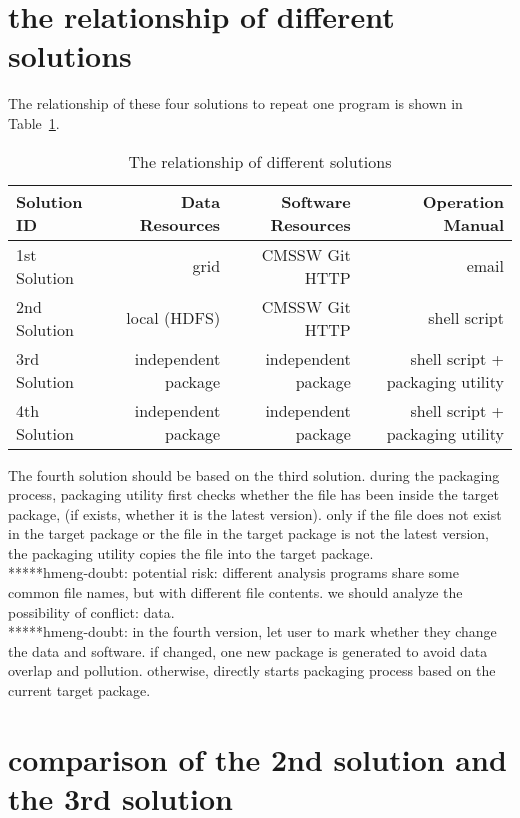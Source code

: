 \documentclass{article}
\begin{document}
\section{the relationship of different solutions}
\indent The relationship of these four solutions to repeat one program is shown in Table~\ref{table:relationship}.\\

\begin{table}
    \centering
    \begin{tabular}{|l|r|r|r|}
        \hline
        Solution ID & Data Resources & Software Resources & Operation Manual \\ \hline
        1st Solution & grid & CMSSW Git HTTP & email \\ \hline
        2nd Solution & local (HDFS) & CMSSW Git HTTP & shell script \\ \hline
        3rd Solution & independent package & independent package & shell script + packaging utility \\ \hline
        4th Solution & independent package & independent package & shell script + packaging utility \\ \hline
    \end{tabular}
    \caption{The relationship of different solutions}
    \label{table:relationship}
\end{table}

The fourth solution should be based on the third solution. during the packaging process, packaging utility first checks whether the file has been inside the target package, (if exists, whether it is the latest version). only if the file does not exist in the target package or the file in the target package is not the latest version, the packaging utility copies the file into the target package.\\

*****hmeng-doubt: potential risk: different analysis programs share some common file names, but with different file contents. we should analyze the possibility of conflict: data.\\

*****hmeng-doubt: in the fourth version, let user to mark whether they change the data and software. if changed, one new package is generated to avoid data overlap and pollution. otherwise, directly starts packaging process based on the current target package. 

\section{comparison of the 2nd solution and the 3rd solution}
\end{document}
